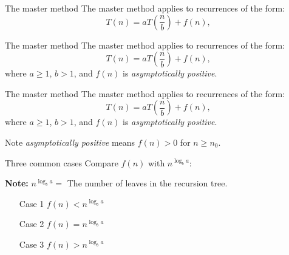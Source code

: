 \documentclass{beamer}
\begin{document}
\begin{frame}{The master method}
    The master method applies to recurrences of the form:
    $$
        T(n) = aT\left(\frac{n}{b} \right) + f(n) \text{,}
    $$
\end{frame}

\begin{frame}{The master method}
    The master method applies to recurrences of the form:
    $$
        T(n) = aT\left(\frac{n}{b} \right) + f(n) \text{,}
    $$
    where $a \geq 1$, $b > 1$, and $f(n)$ is \textit{asymptotically positive}.
\end{frame}

\begin{frame}{The master method}
    The master method applies to recurrences of the form:
    $$
        T(n) = aT\left(\frac{n}{b} \right) + f(n) \text{,}
    $$
    where $a \geq 1$, $b > 1$, and $f(n)$ is \textit{asymptotically positive}.
    \begin{alertblock}{Note}
        \textit{asymptotically positive} means $f(n) > 0$ for $n \geq n_0$.
    \end{alertblock}
\end{frame}

\begin{frame}{Three common cases}
    Compare $f(n)$ with $n^{\log_b a}$: \pause
    \begin{alertblock}{\textbf{Note:}}
        $n^{\log_b a} =$ The number of leaves in the recursion tree.
    \end{alertblock} \pause
    \begin{itemize}
        \item[Case 1] $f(n) < n^{\log_b a}$
        \item[Case 2] $f(n) = n^{\log_b a}$
        \item[Case 3] $f(n) > n^{\log_b a}$
    \end{itemize}


\end{frame}
\end{document}

